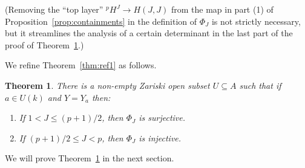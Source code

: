 \documentclass[12pt,reqno]{amsart}
\numberwithin{equation}{section}
\theoremstyle{plain}
\newtheorem{thm}[subsection]{Theorem}
\theoremstyle{definition}
\theoremstyle{remark}
\numberwithin{equation}{section}
\newcommand{\<}{\langle}
\renewcommand{\>}{\rangle}
\def\pH{{}^pH^J}
\begin{document}
(Removing the ``top layer'' $\pH\to H(J,J)$ from the map in part (1)
of Proposition~\ref{prop:containments} in the definition of $\Phi_J$
is not strictly necessary, but it streamlines the analysis of a
certain determinant in the last part of the proof of
Theorem~\ref{thm:ref2}.)

  We refine Theorem~\ref{thm:ref1} as follows.

  \begin{thm}\label{thm:ref2}
    There is a non-empty Zariski open subset $U\subseteq A$ such that if
    $a\in U(k)$ and $Y=Y_a$ then:
    \begin{enumerate}
    \item     If $1< J\le (p+1)/2$, then $\Phi_J$ is surjective.
     \item If $(p+1)/2\le J<p$, then $\Phi_J$ is injective.
    \end{enumerate}
  \end{thm}

  We will prove Theorem~\ref{thm:ref2} in the next section.
\end{document}
